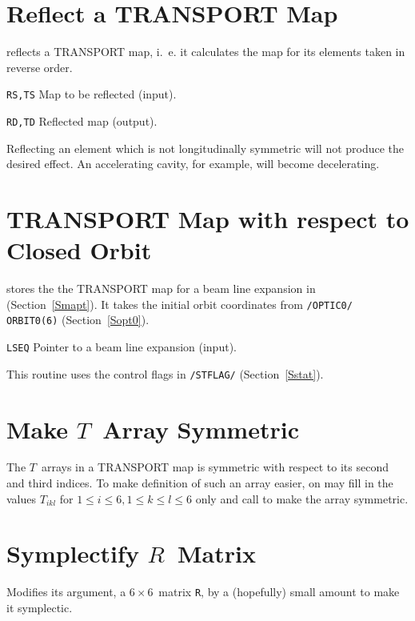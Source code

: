 \section{Reflect a TRANSPORT Map}
\label{TMREFL}
reflects a TRANSPORT map, 
i.~e. it calculates the map for its elements taken in reverse order.
\begin{mylist}
\item[\tt RS,TS]
Map to be reflected (input).
\item[\tt RD,TD]
Reflected map (output).
\end{mylist}
Reflecting an element which is not longitudinally symmetric 
will not produce the desired effect. 
An accelerating cavity, for example, will become decelerating.

\section{TRANSPORT Map with respect to  Closed Orbit}
\label{TMSCND}
stores the the TRANSPORT map for a beam line expansion
in  (Section~\ref{Smapt}).
It takes the initial orbit coordinates from {\tt /OPTIC0/ ORBIT0(6)}
(Section~\ref{Sopt0}).
\begin{mylist}
\item[\tt LSEQ]
Pointer to a beam line expansion (input).
\end{mylist}
This routine uses the control flags in {\tt /STFLAG/}
(Section~\ref{Sstat}). 

\section{Make $T$~Array Symmetric}
\label{TMSYMM}
The $T$~arrays in a TRANSPORT map is symmetric with respect
to its second and third indices.
To make definition of such an array easier, on may fill in
the values $T_{ikl}$ for $1 \le i \le 6, 1 \le k \le l \le 6$ 
only and call
 to make the array symmetric.

\section{Symplectify $R$~Matrix}
\label{TMSYMP}
Modifies its argument, a $6 \times 6$~matrix {\tt R}, 
by a (hopefully) small amount to make it symplectic.

